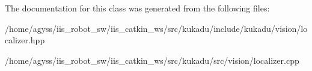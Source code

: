 The documentation for this class was generated from the following files\+:\begin{DoxyCompactItemize}
\item 
/home/agyss/iis\+\_\+robot\+\_\+sw/iis\+\_\+catkin\+\_\+ws/src/kukadu/include/kukadu/vision/localizer.\+hpp\item 
/home/agyss/iis\+\_\+robot\+\_\+sw/iis\+\_\+catkin\+\_\+ws/src/kukadu/src/vision/localizer.\+cpp\end{DoxyCompactItemize}
